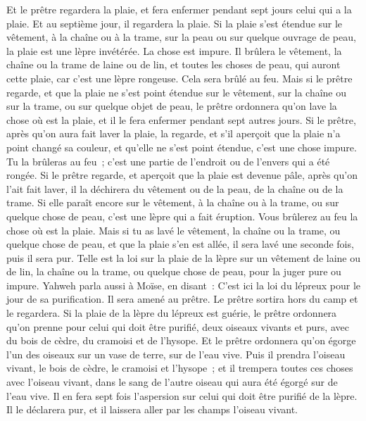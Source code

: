 \begin{multicols}{2}
Et le prêtre regardera la plaie, et fera enfermer pendant sept jours celui qui a la plaie.
Et au septième jour, il regardera la plaie. Si la plaie s'est étendue sur le vêtement, à la chaîne ou à la trame, sur la peau ou sur quelque ouvrage de peau, la plaie est une lèpre invétérée. La chose est impure.
Il brûlera le vêtement, la chaîne ou la trame de laine ou de lin, et toutes les choses de peau, qui auront cette plaie, car c'est une lèpre rongeuse. Cela sera brûlé au feu.
Mais si le prêtre regarde, et que la plaie ne s'est point étendue sur le vêtement, sur la chaîne ou sur la trame, ou sur quelque objet de peau,
le prêtre ordonnera qu'on lave la chose où est la plaie, et il le fera enfermer pendant sept autres jours.
Si le prêtre, après qu'on aura fait laver la plaie, la regarde, et s'il aperçoit que la plaie n'a point changé sa couleur, et qu'elle ne s'est point étendue, c'est une chose impure. Tu la brûleras au feu~; c'est une partie de l'endroit ou de l'envers qui a été rongée.
Si le prêtre regarde, et aperçoit que la plaie est devenue pâle, après qu'on l'ait fait laver, il la déchirera du vêtement ou de la peau, de la chaîne ou de la trame.
Si elle paraît encore sur le vêtement, à la chaîne ou à la trame, ou sur quelque chose de peau, c'est une lèpre qui a fait éruption. Vous brûlerez au feu la chose où est la plaie.
Mais si tu as lavé le vêtement, la chaîne ou la trame, ou quelque chose de peau, et que la plaie s'en est allée, il sera lavé une seconde fois, puis il sera pur.
Telle est la loi sur la plaie de la lèpre sur un vêtement de laine ou de lin, la chaîne ou la trame, ou quelque chose de peau, pour la juger pure ou impure.
\VerseOne{}Yahweh parla aussi à Moïse, en disant~:
C'est ici la loi du lépreux pour le jour de sa purification. Il sera amené au prêtre.
Le prêtre sortira hors du camp et le regardera. Si la plaie de la lèpre du lépreux est guérie,
le prêtre ordonnera qu'on prenne pour celui qui doit être purifié, deux oiseaux vivants et purs, avec du bois de cèdre, du cramoisi et de l'hysope.
Et le prêtre ordonnera qu'on égorge l'un des oiseaux sur un vase de terre, sur de l'eau vive.
Puis il prendra l'oiseau vivant, le bois de cèdre, le cramoisi et l'hysope~; et il trempera toutes ces choses avec l'oiseau vivant, dans le sang de l'autre oiseau qui aura été égorgé sur de l'eau vive.
Il en fera sept fois l'aspersion sur celui qui doit être purifié de la lèpre. Il le déclarera pur, et il laissera aller par les champs l'oiseau vivant.

\end{multicols}
